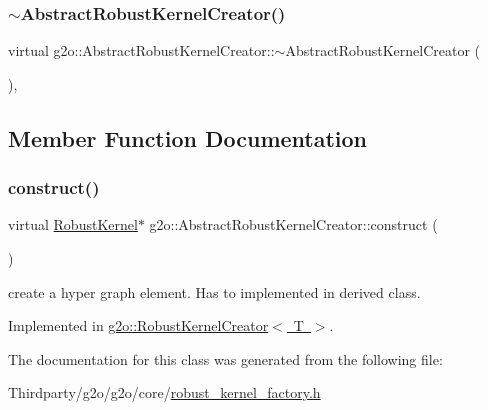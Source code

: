 \subsubsection{\texorpdfstring{$\sim$\+Abstract\+Robust\+Kernel\+Creator()}{~AbstractRobustKernelCreator()}}
{\footnotesize\ttfamily virtual g2o\+::\+Abstract\+Robust\+Kernel\+Creator\+::$\sim$\+Abstract\+Robust\+Kernel\+Creator (\begin{DoxyParamCaption}{ }\end{DoxyParamCaption})\hspace{0.3cm}{\ttfamily [inline]}, {\ttfamily [virtual]}}



\subsection{Member Function Documentation}
\mbox{\label{classg2o_1_1_abstract_robust_kernel_creator_a3022ab9279e52151d37f8cb4d1524d47}} 
\subsubsection{\texorpdfstring{construct()}{construct()}}
{\footnotesize\ttfamily virtual \mbox{\hyperlink{classg2o_1_1_robust_kernel}{Robust\+Kernel}}$\ast$ g2o\+::\+Abstract\+Robust\+Kernel\+Creator\+::construct (\begin{DoxyParamCaption}{ }\end{DoxyParamCaption})\hspace{0.3cm}{\ttfamily [pure virtual]}}

create a hyper graph element. Has to implemented in derived class. 

Implemented in \mbox{\hyperlink{classg2o_1_1_robust_kernel_creator_a6ab30adc017675641bd55502d7da0085}{g2o\+::\+Robust\+Kernel\+Creator$<$ T $>$}}.



The documentation for this class was generated from the following file\+:\begin{DoxyCompactItemize}
\item 
Thirdparty/g2o/g2o/core/\mbox{\hyperlink{robust__kernel__factory_8h}{robust\+\_\+kernel\+\_\+factory.\+h}}\end{DoxyCompactItemize}
